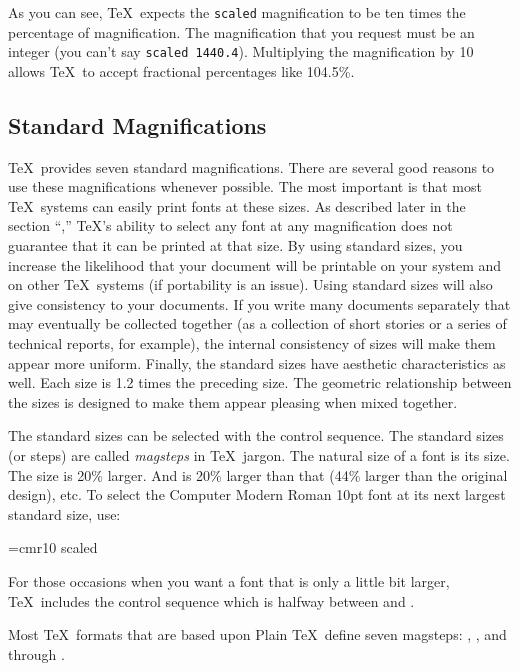 As you can see, \TeX\ expects the \verb|scaled| magnification to be ten times
the percentage of magnification.  The magnification that you request must be
an integer (you can't say \verb|scaled 1440.4|).  Multiplying the
magnification by 10 allows \TeX\ to accept fractional percentages like
104.5\%.

\subsection{Standard Magnifications}

\TeX\ provides seven standard 
magnifications.  There are several good
reasons to use these magnifications whenever possible.  The most
important is that most \TeX\ systems can easily print fonts at
these sizes.  As described later in the section ``,''
\TeX's ability to select any font at any magnification does
not guarantee that it can be printed at that size.  By using standard
sizes, you increase the likelihood that your document will be
printable on your system and on other \TeX\ systems (if portability is
an issue).  Using standard sizes will also give consistency to your
documents.  If you write many documents separately that may eventually
be collected together (as a collection of short stories or a series of
technical reports, for example), the internal consistency of sizes
will make them appear more uniform.  Finally, the standard sizes have
aesthetic characteristics as well.  Each size is 1.2 times the
preceding size.  The geometric relationship between the sizes is
designed to make them appear pleasing when mixed together.

The standard sizes can be selected with the  control
sequence.  The standard sizes (or steps) are called \textit{magsteps} in
\TeX\ jargon.  The natural size of a font is its 
size.  The  size is 20\% larger.  And
 is 20\% larger than that (44\% larger than the
original design), etc.  To select the Computer Modern Roman 10pt font
at its next largest standard size, use:

\begin{shortexample}
\font\larger=cmr10 scaled
\end{shortexample}

For those occasions when you want a font that is only a little bit
larger, \TeX\ includes the control sequence  which
is halfway between  and .

Most \TeX\ formats that are based upon Plain \TeX\ define seven magsteps:
, , and  through 
.

